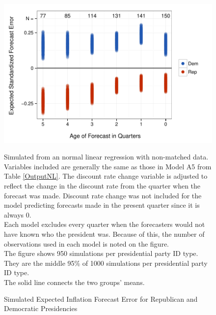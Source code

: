 \documentclass[a4paper]{article}\usepackage{graphicx, color}
\newenvironment{knitrout}{}{} %
\begin{document}
\begin{figure}[t]
    \caption{Simulated Expected Inflation Forecast Error for Republican and Democratic Presidencies}
    \label{ExpectValueParty}
    \begin{center}

\begin{knitrout}
\color{fgcolor}

{\centering \includegraphics[width=0.81\linewidth]{figure/ExpectValueParty} 

}



\end{knitrout}





    \end{center}
    \begin{singlespace}
        {\scriptsize{Simulated from an normal linear regression with non-matched data. Variables included are generally the same as those in Model A5 from Table \ref{OutputNL}. The discount rate change variable is adjusted to reflect the change in the discount rate from the quarter when the forecast was made. Discount rate change was not included for the model predicting forecasts made in the present quarter since it is always 0. \\ Each model excludes every quarter when the forecasters would not have known who the president was. Because of this, the number of observations used in each model is noted on the figure. \\ The figure shows 950 simulations per presidential party ID type. They are the middle 95\% of 1000 simulations per presidential party ID type. \\ The solid line connects the two groups' means.}}
    \end{singlespace}
\end{figure}
\end{document}
